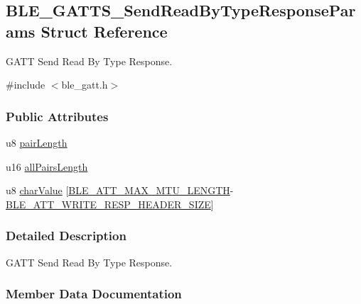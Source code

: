 \hypertarget{struct_b_l_e___g_a_t_t_s___send_read_by_type_response_params}{}\subsection{B\+L\+E\+\_\+\+G\+A\+T\+T\+S\+\_\+\+Send\+Read\+By\+Type\+Response\+Params Struct Reference}
\label{struct_b_l_e___g_a_t_t_s___send_read_by_type_response_params}


G\+A\+TT Send Read By Type Response.  




{\ttfamily \#include $<$ble\+\_\+gatt.\+h$>$}

\subsubsection*{Public Attributes}
\begin{DoxyCompactItemize}
\item 
u8 \hyperlink{struct_b_l_e___g_a_t_t_s___send_read_by_type_response_params_a4295128e899dad826a5a0b09c9c11525}{pair\+Length}
\item 
u16 \hyperlink{struct_b_l_e___g_a_t_t_s___send_read_by_type_response_params_ac13cc60b9b58b9a851d35fd943228d20}{all\+Pairs\+Length}
\item 
u8 \hyperlink{struct_b_l_e___g_a_t_t_s___send_read_by_type_response_params_ab635949a086ff203d37df1ec770a68a0}{char\+Value} \mbox{[}\hyperlink{group___b_l_e___g_a_t_t_ga380151ce5e77dadfae069f37afd70b8b}{B\+L\+E\+\_\+\+A\+T\+T\+\_\+\+M\+A\+X\+\_\+\+M\+T\+U\+\_\+\+L\+E\+N\+G\+TH}-\/\hyperlink{group___b_l_e___g_a_t_t_ga6a4807bfe93a96506caa739c30038acd}{B\+L\+E\+\_\+\+A\+T\+T\+\_\+\+W\+R\+I\+T\+E\+\_\+\+R\+E\+S\+P\+\_\+\+H\+E\+A\+D\+E\+R\+\_\+\+S\+I\+ZE}\mbox{]}
\end{DoxyCompactItemize}


\subsubsection{Detailed Description}
G\+A\+TT Send Read By Type Response. 

\subsubsection{Member Data Documentation}
